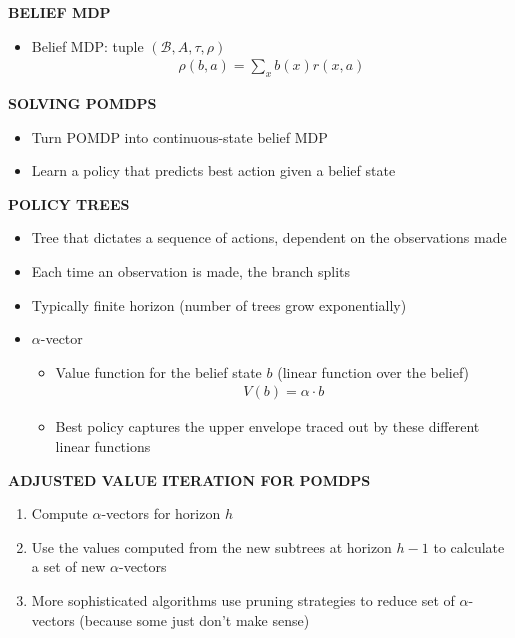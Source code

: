 \begin{whitebox}{\textbf{BELIEF MDP}}
    \begin{itemize}
        \item Belief MDP: tuple $(\mathcal{B},A,\tau,\rho)$
        \begin{align*}
            \rho(b,a)=\sum_xb(x)r(x,a)
        \end{align*}
    \end{itemize}
\end{whitebox}

\begin{whitebox}{\textbf{SOLVING POMDPS}}
    \begin{itemize}
        \item Turn POMDP into continuous-state belief MDP
        \item Learn a policy that predicts best action given a belief state
    \end{itemize}
\end{whitebox}

\begin{whitebox}{\textbf{POLICY TREES}}
    \begin{itemize}
        \item Tree that dictates a sequence of actions, dependent on the observations made
        \item Each time an observation is made, the branch splits
        \item Typically finite horizon (number of trees grow exponentially)
        \item $\alpha$-vector
        \begin{itemize}
            \item Value function for the belief state $b$ (linear function over the belief)
            \begin{align*}
                V(b)=\alpha\cdot b
            \end{align*}
            \item Best policy captures the upper envelope traced out by these different linear functions
        \end{itemize}
    \end{itemize}
\end{whitebox}

\begin{whitebox}{\textbf{ADJUSTED VALUE ITERATION FOR POMDPS}}
    \begin{enumerate}
        \item Compute $\alpha$-vectors for horizon $h$
        \item Use the values computed from the new subtrees at horizon $h-1$ to calculate a set of new $\alpha$-vectors
        \item More sophisticated algorithms use pruning strategies to reduce set of $\alpha$-vectors (because some just don't make sense)
    \end{enumerate}
\end{whitebox}
